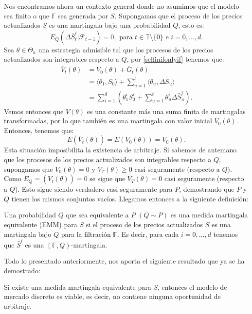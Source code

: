 Nos encontramos ahora un contexto general donde no asumimos que el modelo sea finito o que $ \mathbb{F} $ sea generada por $ S $. Supongamos que el proceso de los precios actualizados $ \bar{S} $ es una martingala bajo una probabilidad $ Q $, esto es:
\[
E_Q (\Delta \bar{S}^i_t | \mathcal{F}_{t-1}) = 0, \text{ para } t \in \mathbb{T}\setminus \{0\} \text{ e } i = 0,\dots,d.
\]
Sea $ \theta \in \Theta_a $ una estrategia admisible tal que los procesos de los precios actualizados son integrables respecto a $ Q $, por \eqref{selfinifonlyif} tenemos que:
\begin{equation*}
\begin{split}
\bar{V}_t(\theta) &= V_0(\theta) + \bar{G}_t(\theta) \\
&= \langle \theta_{1}, S_0 \rangle + \sum_{u=1}^{t} \langle \theta_{u}, \Delta \bar{S}_u \rangle \\
&= \sum_{i=1}^{d}(\theta_1^i S_0^i + \sum_{u=1}^{t} \theta_{u}^i \Delta \bar{S}_u^i).
\end{split}
\end{equation*}
Vemos entonces que $ \bar{V}(\theta) $ es una constante más una suma finita de martingalas transformadas, por lo que también es una martingala con valor inicial $ V_0 (\theta) $. Entonces, tenemos que: \[ E(\bar{V}_t (\theta)) = E(V_0 (\theta)) = V_0(\theta) .\] 
Esta situación imposibilita la existencia de arbitraje. Si sabemos de antemano que los procesos de los precios actualizados son integrables respecto a $ Q $, supongamos que $ V_0 (\theta) = 0$ y $ V_T (\theta) \geq 0$ casi seguramente (respecto a $ Q $). Como $ E_Q = (\bar{V}_t ( \theta)) = 0 $ se sigue que $ V_T(\theta) = 0$ casi seguramente (respecto a $ Q $). Esto sigue siendo verdadero casi seguramente para $ P $, demostrando que $ P $ y $ Q $ tienen los mismos conjuntos vacíos. Llegamos entonces a la siguiente definición:
\begin{definicion}
Una probabilidad $ Q $ que sea equivalente a $ P $ $ (Q\sim P) $ es una medida martingala equivalente (EMM) para $ S $ si el proceso de los precios actualizados $ \bar{S} $ es una martingala bajo $ Q $ para la filtración $ \mathbb{F} $. Es decir, para cada $ i =0,\dots, d $ tenemos que $ \bar{S}^i $ es una $ (\mathbb{F},Q) $-martingala.
\end{definicion}

Todo lo presentado anteriormente, nos aporta el siguiente resultado que ya se ha demostrado:
\begin{proposicionBox}\label{martThenViab}
Si existe una medida martingala equivalente para $ S $, entonces el modelo de mercado discreto es viable, es decir, no contiene ninguna oportunidad de arbitraje.	
\end{proposicionBox}

